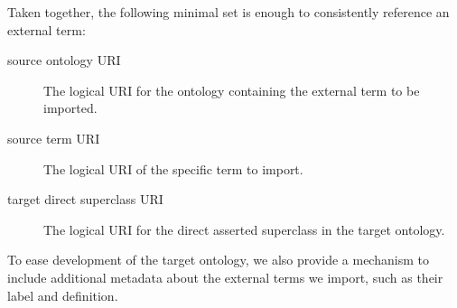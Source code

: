 \documentclass[a4paper,10pt,twocolumn]{article}
\newcommand{\protege}{Prot\'{e}g\'{e}}
\begin{document}

Taken together, the following minimal set is enough to consistently reference an external term:
\begin{description}
 \item[source ontology URI] The logical URI for the ontology containing the external term to be imported. %
 \item[source term URI] The logical URI of the specific term to import. %
 \item[target direct superclass URI] The logical URI for the direct asserted superclass in the target ontology. %
 \end{description} 
 


To ease development of the target ontology, we also provide a mechanism to include additional metadata about the external terms we import, such as their label and definition.





\end{document}
